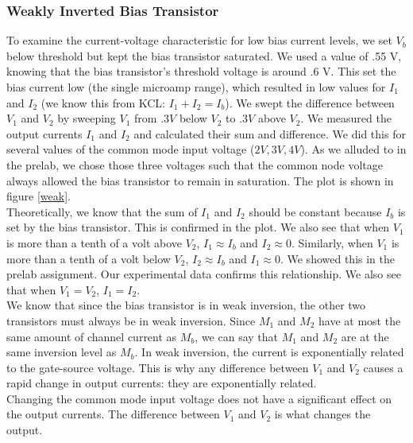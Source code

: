 \documentclass{article}
\begin{document}
\subsubsection*{Weakly Inverted Bias Transistor}
To examine the current-voltage characteristic for low bias current levels, we set $V_b$ below threshold but kept the bias transistor saturated. We used a value of .55 V, knowing that the bias transistor's threshold voltage is around .6 V.  This set the bias current low (the single microamp range), which resulted in low values for $I_1$ and $I_2$ (we know this from KCL: $I_1+I_2=I_b$). We swept the difference between $V_1$ and $V_2$ by sweeping $V_1$ from $.3V$ below $V_2$ to $.3V$ above $V_2$. We measured the output currents $I_1$ and $I_2$ and calculated their sum and difference. We did this for several values of the common mode input voltage ($2V,3V,4V$). As we alluded to in the prelab, we chose those three voltages such that the common node voltage always allowed the bias transistor to remain in saturation.  The plot is shown in figure \ref{weak}.\\

Theoretically, we know that the sum of $I_1$ and $I_2$ should be constant because $I_b$ is set by the bias transistor. This is confirmed in the plot. We also see that when $V_1$ is more than a tenth of a volt above $V_2$, $I_1 \approx I_b$ and $I_2 \approx 0$. Similarly, when $V_1$ is more than a tenth of a volt below $V_2$, $I_2 \approx I_b$ and $I_1 \approx 0$. We showed this in the prelab assignment. Our experimental data confirms this relationship. We also see that when $V_1=V_2$, $I_1=I_2$.\\

We know that since the bias transistor is in weak inversion, the other two transistors must always be in weak inversion. Since $M_1$ and $M_2$ have at most the same amount of channel current as $M_b$, we can say that $M_1$ and $M_2$ are at the same inversion level as $M_b$. In weak inversion, the current is exponentially related to the gate-source voltage. This is why any difference between $V_1$ and $V_2$ causes a rapid change in output currents: they are exponentially related. \\

Changing the common mode input voltage does not have a significant effect on the output currents. The difference between $V_1$ and $V_2$ is what changes the output.\\
\end{document}
